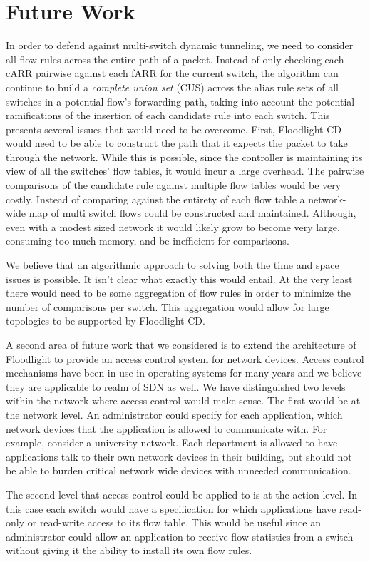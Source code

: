 \section{Future Work}
\label{sec:future}

In order to defend against multi-switch dynamic tunneling, we need to consider all flow rules across the entire path of a packet.
Instead of only checking each cARR pairwise against each fARR for the current switch, the algorithm can continue to build a \emph{complete union set} (CUS) across the alias rule sets of all switches in a potential flow's forwarding path, taking into account the potential ramifications of the insertion of each candidate rule into each switch. 
This presents several issues that would need to be overcome.
First, Floodlight-CD would need to be able to construct the path that it expects the packet to take through the network.
While this is possible, since the controller is maintaining its view of all the switches' flow tables, it would incur a large overhead.
The pairwise comparisons of the candidate rule against multiple flow tables would be very costly. 
Instead of comparing against the entirety of each flow table a network-wide map of multi switch flows could be constructed and maintained.
Although, even with a modest sized network it would likely grow to become very large, consuming too much memory, and be inefficient for comparisons.

We believe that an algorithmic approach to solving both the time and space issues is possible.
It isn't clear what exactly this would entail.
At the very least there would need to be some aggregation of flow rules in order to minimize the number of comparisons per switch.
This aggregation would allow for large topologies to be supported by Floodlight-CD.

A second area of future work that we considered is to extend the architecture of Floodlight to provide an access control system for network devices.
Access control mechanisms have been in use in operating systems for many years and we believe they are applicable to realm of SDN as well.
We have distinguished two levels within the network where access control would make sense.
The first would be at the network level.
An administrator could specify for each application, which network devices that the application is allowed to communicate with.
For example, consider a university network.
Each department is allowed to have applications talk to their own network devices in their building, but should not be able to burden critical network wide devices with unneeded communication.

The second level that access control could be applied to is at the action level.
In this case each switch would have a specification for which applications have read-only or read-write access to its flow table.
This would be useful since an administrator could allow an application to receive flow statistics from a switch without giving it the ability to install its own flow rules.

